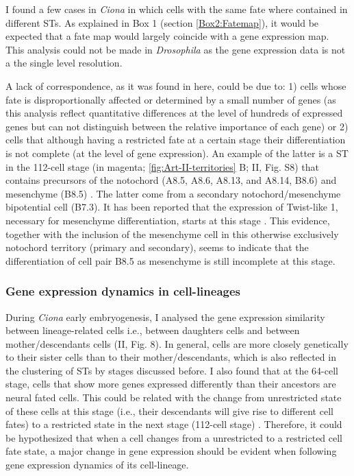 
I found a few cases in \textit{Ciona} in which cells with the same fate where contained in different STs. As explained in Box 1 (section \ref{Box2:Fatemap}), it would be expected that a fate map would largely coincide with a gene expression map. This analysis could not be made in \textit{Drosophila} as the gene expression data is not a the single level resolution.

A lack of correspondence, as it was found in here, could be due to: 1) cells whose fate is disproportionally affected or determined by a small number of genes (as this analysis reflect quantitative differences at the level of hundreds of expressed genes but can not distinguish between the relative importance of each gene) or 2) cells that although having a restricted fate at a certain stage their differentiation is not complete (at the level of gene expression).
%
An example of the latter is a ST in the 112-cell stage (in magenta; \ref{fig:Art-II-territories} B; II, Fig. S8) that contains precursors of the notochord (A8.5, A8.6, A8.13, and A8.14, B8.6) and mesenchyme (B8.5) \citep{Tokuoka2004}.
The latter come from a secondary notochord/mesenchyme bipotential cell (B7.3). It has been reported that the expression of Twist-like 1, necessary for mesenchyme differentiation, starts at this stage \citep{Imai2003}.
This evidence, together with the inclusion of the mesenchyme cell in this otherwise exclusively notochord territory (primary and secondary), seems to indicate that the differentiation of cell pair B8.5 as mesenchyme is still incomplete at this stage.

\subsubsection{Gene expression dynamics in cell-lineages}

During \textit{Ciona} early embryogenesis, I analysed the gene expression similarity between lineage-related cells i.e., between daughters cells and between mother/descendants cells (II, Fig. 8).
In general, cells are more closely genetically to their sister cells than to their mother/descendants, which is also reflected in the clustering of STs by stages discussed before.
I also found that at the 64-cell stage, cells that show more genes expressed differently than their ancestors are neural fated cells. This could be related with the change from unrestricted state of these cells at this stage (i.e., their descendants will give rise to different cell fates) to a restricted state in the next stage (112-cell stage) \citep{Imai2006}.
Therefore, it could be hypothesized that when a cell changes from a unrestricted to a restricted cell fate state, a major change in gene expression should be evident when following gene expression dynamics of its cell-lineage.  